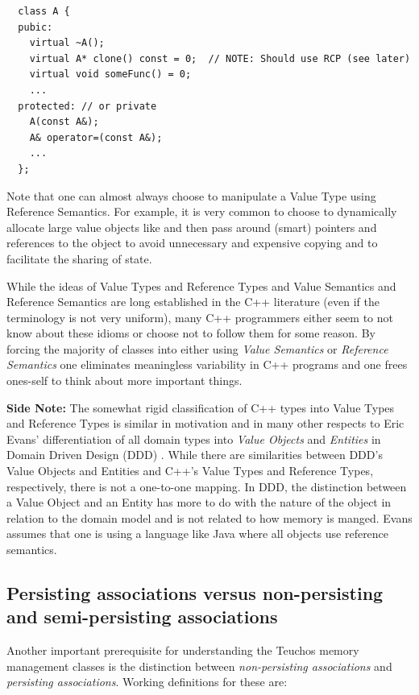 \documentclass[pdf,ps2pdf,11pt]{SANDreport}
\begin{document}
{\small\begin{verbatim}
  class A {
  pubic:
    virtual ~A();
    virtual A* clone() const = 0;  // NOTE: Should use RCP (see later)
    virtual void someFunc() = 0;
    ...
  protected: // or private
    A(const A&);
    A& operator=(const A&);
    ...
  };
\end{verbatim}}

Note that one can almost always choose to manipulate a Value Type
using Reference Semantics.  For example, it is very common to choose
to dynamically allocate large value objects like {}
and then pass around (smart) pointers and references to the object to
avoid unnecessary and expensive copying and to facilitate the sharing
of state.

While the ideas of Value Types and Reference Types and Value Semantics
and Reference Semantics are long established in the C++ literature
(even if the terminology is not very uniform), many C++ programmers
either seem to not know about these idioms or choose not to follow
them for some reason.  By forcing the majority of classes into either
using {}\textit{Value Semantics} or {}\textit{Reference Semantics} one
eliminates meaningless variability in C++ programs and one frees
ones-self to think about more important things.

{}\textbf{Side Note:} The somewhat rigid classification of C++ types
into Value Types and Reference Types is similar in motivation and in
many other respects to Eric Evans' differentiation of all domain types
into {}\textit{Value Objects} and {}\textit{Entities} in Domain Driven
Design (DDD) {}\cite{DomainDrivenDesign}.  While there are
similarities between DDD's Value Objects and Entities and C++'s Value
Types and Reference Types, respectively, there is not a one-to-one
mapping.  In DDD, the distinction between a Value Object and an Entity
has more to do with the nature of the object in relation to the domain
model and is not related to how memory is manged.  Evans assumes that
one is using a language like Java where all objects use reference
semantics.


%
{}\subsection{Persisting associations versus non-persisting and
semi-persisting associations}
\label{sec:persisting-nonpersisting-associations}
%

Another important prerequisite for understanding the Teuchos memory
management classes is the distinction between {}\textit{non-persisting
associations} and {}\textit{persisting associations}.  Working
definitions for these are:
\end{document}
